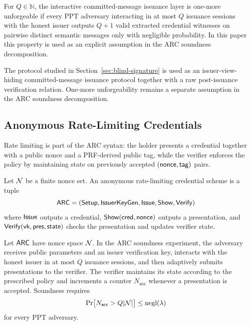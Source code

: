 \begin{definition}\label{def:bs-one-more}
For \(Q\in\mathbb N\), the interactive committed-message issuance layer is one-more unforgeable if every PPT
adversary interacting in at most \(Q\) issuance sessions with the honest issuer outputs \(Q+1\) valid extracted
credential witnesses on pairwise distinct semantic messages only with negligible probability.  In this paper this
property is used as an explicit assumption in the ARC soundness decomposition.
\end{definition}

\begin{remark}\label{rem:bs-scope}
The protocol studied in Section~\ref{sec:blind-signature} is used as an issuer-view-hiding committed-message
issuance protocol together with a raw post-issuance verification relation.  One-more unforgeability remains a
separate assumption in the ARC soundness decomposition.
\end{remark}

\subsection{Anonymous Rate-Limiting Credentials}
\label{subsec:arc-security}
Rate limiting is part of the ARC syntax: the holder presents a credential together with a public nonce and a
PRF-derived public tag, while the verifier enforces the policy by maintaining state on previously accepted
\((\mathsf{nonce},\mathsf{tag})\) pairs.

\begin{definition}\label{def:arc-syntax}
Let \(\mathcal{N}\) be a finite nonce set.  An anonymous rate-limiting credential scheme is a tuple
\[
  \mathsf{ARC}=(\mathsf{Setup},\mathsf{IssuerKeyGen},\mathsf{Issue},\mathsf{Show},\mathsf{Verify})
\]
where \(\mathsf{Issue}\) outputs a credential, \(\mathsf{Show}(\mathsf{cred},\mathsf{nonce})\) outputs a presentation, and
\(\mathsf{Verify}(\mathsf{vk},\mathsf{pres},\mathsf{state})\) checks the presentation and updates verifier state.
\end{definition}

\begin{definition}\label{def:arc-soundness}
Let \(\mathsf{ARC}\) have nonce space \(\mathcal{N}\).  In the ARC soundness experiment, the adversary receives public
parameters and an issuer verification key, interacts with the honest issuer in at most \(Q\) issuance sessions, and
then adaptively submits presentations to the verifier.  The verifier maintains its state according to the prescribed
policy and increments a counter \(N_{\mathsf{acc}}\) whenever a presentation is accepted.  Soundness requires
\[
  \Pr\bigl[N_{\mathsf{acc}}>Q|\mathcal{N}|\bigr]\le\mathrm{negl}(\lambda)
\]
for every PPT adversary.
\end{definition}

